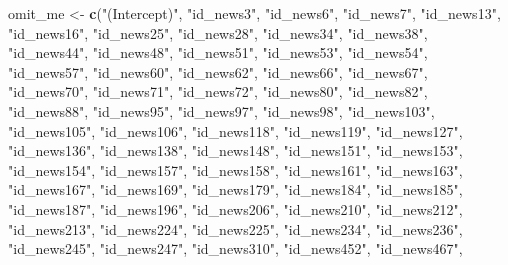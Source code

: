 \documentclass[
]{book}
\newenvironment{Shaded}{\begin{snugshade}}{\end{snugshade}}
\newcommand{\KeywordTok}[1]{\textcolor[rgb]{0.13,0.29,0.53}{\textbf{#1}}}
\newcommand{\NormalTok}[1]{#1}
\newcommand{\StringTok}[1]{\textcolor[rgb]{0.31,0.60,0.02}{#1}}
\begin{document}
\begin{Shaded}
\begin{Highlighting}[]
\NormalTok{omit_me <-}\StringTok{ }\KeywordTok{c}\NormalTok{(}\StringTok{"(Intercept)"}\NormalTok{, }\StringTok{"id_news3"}\NormalTok{, }\StringTok{"id_news6"}\NormalTok{, }\StringTok{"id_news7"}\NormalTok{, }\StringTok{"id_news13"}\NormalTok{, }
             \StringTok{"id_news16"}\NormalTok{, }\StringTok{"id_news25"}\NormalTok{, }\StringTok{"id_news28"}\NormalTok{, }\StringTok{"id_news34"}\NormalTok{, }\StringTok{"id_news38"}\NormalTok{, }
             \StringTok{"id_news44"}\NormalTok{, }\StringTok{"id_news48"}\NormalTok{, }\StringTok{"id_news51"}\NormalTok{, }\StringTok{"id_news53"}\NormalTok{, }\StringTok{"id_news54"}\NormalTok{, }
             \StringTok{"id_news57"}\NormalTok{, }\StringTok{"id_news60"}\NormalTok{, }\StringTok{"id_news62"}\NormalTok{, }\StringTok{"id_news66"}\NormalTok{, }\StringTok{"id_news67"}\NormalTok{, }
             \StringTok{"id_news70"}\NormalTok{, }\StringTok{"id_news71"}\NormalTok{, }\StringTok{"id_news72"}\NormalTok{, }\StringTok{"id_news80"}\NormalTok{, }\StringTok{"id_news82"}\NormalTok{, }
             \StringTok{"id_news88"}\NormalTok{, }\StringTok{"id_news95"}\NormalTok{, }\StringTok{"id_news97"}\NormalTok{, }\StringTok{"id_news98"}\NormalTok{, }\StringTok{"id_news103"}\NormalTok{, }
             \StringTok{"id_news105"}\NormalTok{, }\StringTok{"id_news106"}\NormalTok{, }\StringTok{"id_news118"}\NormalTok{, }\StringTok{"id_news119"}\NormalTok{, }\StringTok{"id_news127"}\NormalTok{, }
             \StringTok{"id_news136"}\NormalTok{, }\StringTok{"id_news138"}\NormalTok{, }\StringTok{"id_news148"}\NormalTok{, }\StringTok{"id_news151"}\NormalTok{, }\StringTok{"id_news153"}\NormalTok{, }
             \StringTok{"id_news154"}\NormalTok{, }\StringTok{"id_news157"}\NormalTok{, }\StringTok{"id_news158"}\NormalTok{, }\StringTok{"id_news161"}\NormalTok{, }\StringTok{"id_news163"}\NormalTok{, }
             \StringTok{"id_news167"}\NormalTok{, }\StringTok{"id_news169"}\NormalTok{, }\StringTok{"id_news179"}\NormalTok{, }\StringTok{"id_news184"}\NormalTok{, }\StringTok{"id_news185"}\NormalTok{, }
             \StringTok{"id_news187"}\NormalTok{, }\StringTok{"id_news196"}\NormalTok{, }\StringTok{"id_news206"}\NormalTok{, }\StringTok{"id_news210"}\NormalTok{, }\StringTok{"id_news212"}\NormalTok{, }
             \StringTok{"id_news213"}\NormalTok{, }\StringTok{"id_news224"}\NormalTok{, }\StringTok{"id_news225"}\NormalTok{, }\StringTok{"id_news234"}\NormalTok{, }\StringTok{"id_news236"}\NormalTok{, }
             \StringTok{"id_news245"}\NormalTok{, }\StringTok{"id_news247"}\NormalTok{, }\StringTok{"id_news310"}\NormalTok{, }\StringTok{"id_news452"}\NormalTok{, }\StringTok{"id_news467"}\NormalTok{, }

\end{Highlighting}
\end{Shaded}
\end{document}
